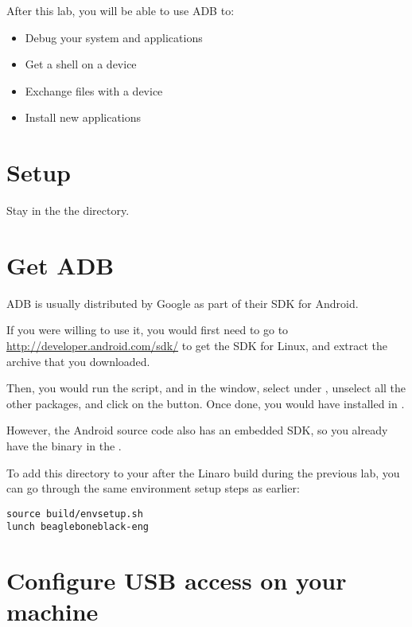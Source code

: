 
After this lab, you will be able to use ADB to:
\begin{itemize}
  \item Debug your system and applications
  \item Get a shell on a device
  \item Exchange files with a device
  \item Install new applications
\end{itemize}

\section{Setup}

Stay in the the  directory.

\section{Get ADB}

ADB is usually distributed by Google as part of their SDK for Android.

If you were willing to use it, you would first need to go to
\url{http://developer.android.com/sdk/} to get the SDK for Linux, and
extract the archive that you downloaded.

Then, you would run the  script, and in the
 window, select  under
, unselect all the other packages, and click on the
 button.  Once done, you would have
 installed in .

However, the Android source code also has an embedded SDK, so you
already have the  binary in the
.

To add this directory to your  after the Linaro build
during the previous lab, you can go through the same environment setup
steps as earlier:

\begin{verbatim}
source build/envsetup.sh
lunch beagleboneblack-eng
\end{verbatim}

\section{Configure USB access on your machine}

